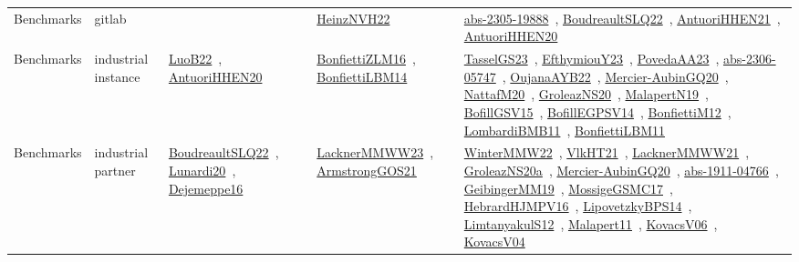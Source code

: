 {\begin{longtable}{lp{3cm}>{\raggedright\arraybackslash}p{6cm}>{\raggedright\arraybackslash}p{6cm}>{\raggedright\arraybackslash}p{8cm}}
Benchmarks & gitlab &  & \href{works/HeinzNVH22.pdf}{HeinzNVH22}~\cite{HeinzNVH22} & \href{works/abs-2305-19888.pdf}{abs-2305-19888}~\cite{abs-2305-19888}, \href{works/BoudreaultSLQ22.pdf}{BoudreaultSLQ22}~\cite{BoudreaultSLQ22}, \href{works/AntuoriHHEN21.pdf}{AntuoriHHEN21}~\cite{AntuoriHHEN21}, \href{works/AntuoriHHEN20.pdf}{AntuoriHHEN20}~\cite{AntuoriHHEN20}\\
Benchmarks & industrial instance & \href{works/LuoB22.pdf}{LuoB22}~\cite{LuoB22}, \href{works/AntuoriHHEN20.pdf}{AntuoriHHEN20}~\cite{AntuoriHHEN20} & \href{works/BonfiettiZLM16.pdf}{BonfiettiZLM16}~\cite{BonfiettiZLM16}, \href{works/BonfiettiLBM14.pdf}{BonfiettiLBM14}~\cite{BonfiettiLBM14} & \href{works/TasselGS23.pdf}{TasselGS23}~\cite{TasselGS23}, \href{works/EfthymiouY23.pdf}{EfthymiouY23}~\cite{EfthymiouY23}, \href{works/PovedaAA23.pdf}{PovedaAA23}~\cite{PovedaAA23}, \href{works/abs-2306-05747.pdf}{abs-2306-05747}~\cite{abs-2306-05747}, \href{works/OujanaAYB22.pdf}{OujanaAYB22}~\cite{OujanaAYB22}, \href{works/Mercier-AubinGQ20.pdf}{Mercier-AubinGQ20}~\cite{Mercier-AubinGQ20}, \href{works/NattafM20.pdf}{NattafM20}~\cite{NattafM20}, \href{works/GroleazNS20.pdf}{GroleazNS20}~\cite{GroleazNS20}, \href{works/MalapertN19.pdf}{MalapertN19}~\cite{MalapertN19}, \href{works/BofillGSV15.pdf}{BofillGSV15}~\cite{BofillGSV15}, \href{works/BofillEGPSV14.pdf}{BofillEGPSV14}~\cite{BofillEGPSV14}, \href{works/BonfiettiM12.pdf}{BonfiettiM12}~\cite{BonfiettiM12}, \href{works/LombardiBMB11.pdf}{LombardiBMB11}~\cite{LombardiBMB11}, \href{works/BonfiettiLBM11.pdf}{BonfiettiLBM11}~\cite{BonfiettiLBM11}\\
Benchmarks & industrial partner & \href{works/BoudreaultSLQ22.pdf}{BoudreaultSLQ22}~\cite{BoudreaultSLQ22}, \href{works/Lunardi20.pdf}{Lunardi20}~\cite{Lunardi20}, \href{works/Dejemeppe16.pdf}{Dejemeppe16}~\cite{Dejemeppe16} & \href{works/LacknerMMWW23.pdf}{LacknerMMWW23}~\cite{LacknerMMWW23}, \href{works/ArmstrongGOS21.pdf}{ArmstrongGOS21}~\cite{ArmstrongGOS21} & \href{works/WinterMMW22.pdf}{WinterMMW22}~\cite{WinterMMW22}, \href{works/VlkHT21.pdf}{VlkHT21}~\cite{VlkHT21}, \href{works/LacknerMMWW21.pdf}{LacknerMMWW21}~\cite{LacknerMMWW21}, \href{works/GroleazNS20a.pdf}{GroleazNS20a}~\cite{GroleazNS20a}, \href{works/Mercier-AubinGQ20.pdf}{Mercier-AubinGQ20}~\cite{Mercier-AubinGQ20}, \href{works/abs-1911-04766.pdf}{abs-1911-04766}~\cite{abs-1911-04766}, \href{works/GeibingerMM19.pdf}{GeibingerMM19}~\cite{GeibingerMM19}, \href{works/MossigeGSMC17.pdf}{MossigeGSMC17}~\cite{MossigeGSMC17}, \href{works/HebrardHJMPV16.pdf}{HebrardHJMPV16}~\cite{HebrardHJMPV16}, \href{works/LipovetzkyBPS14.pdf}{LipovetzkyBPS14}~\cite{LipovetzkyBPS14}, \href{works/LimtanyakulS12.pdf}{LimtanyakulS12}~\cite{LimtanyakulS12}, \href{works/Malapert11.pdf}{Malapert11}~\cite{Malapert11}, \href{works/KovacsV06.pdf}{KovacsV06}~\cite{KovacsV06}, \href{works/KovacsV04.pdf}{KovacsV04}~\cite{KovacsV04}\\

\end{longtable}}
